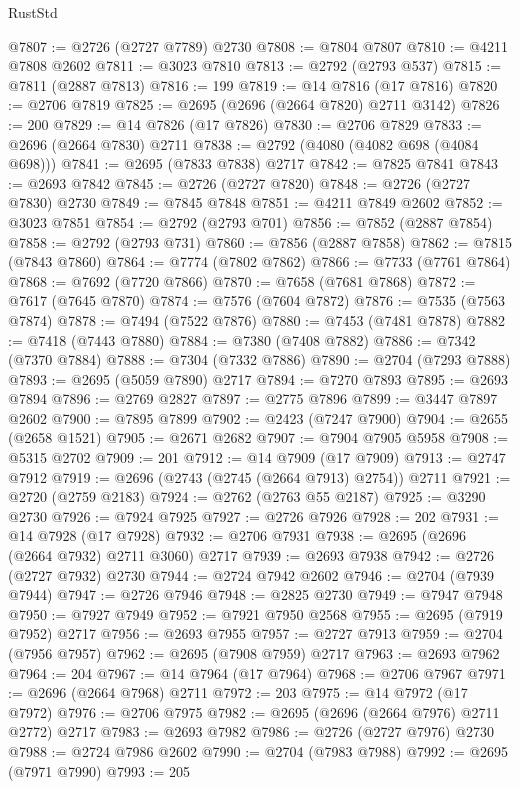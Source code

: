 \begin{lexlean}{RustStd}
\begin{coremodule}
@7807 := @2726 (@2727 @7789) @2730
@7808 := @7804 @7807
@7810 := @4211 @7808 @2602
@7811 := @3023 @7810
@7813 := @2792 (@2793 @537)
@7815 := @7811 (@2887 @7813)
@7816 := 199
@7819 := @14 @7816 (@17 @7816)
@7820 := @2706 @7819
@7825 := @2695 (@2696 (@2664 @7820) @2711 @3142)
@7826 := 200
@7829 := @14 @7826 (@17 @7826)
@7830 := @2706 @7829
@7833 := @2696 (@2664 @7830) @2711
@7838 := @2792 (@4080 (@4082 @698 (@4084 @698)))
@7841 := @2695 (@7833 @7838) @2717
@7842 := @7825 @7841
@7843 := @2693 @7842
@7845 := @2726 (@2727 @7820)
@7848 := @2726 (@2727 @7830) @2730
@7849 := @7845 @7848
@7851 := @4211 @7849 @2602
@7852 := @3023 @7851
@7854 := @2792 (@2793 @701)
@7856 := @7852 (@2887 @7854)
@7858 := @2792 (@2793 @731)
@7860 := @7856 (@2887 @7858)
@7862 := @7815 (@7843 @7860)
@7864 := @7774 (@7802 @7862)
@7866 := @7733 (@7761 @7864)
@7868 := @7692 (@7720 @7866)
@7870 := @7658 (@7681 @7868)
@7872 := @7617 (@7645 @7870)
@7874 := @7576 (@7604 @7872)
@7876 := @7535 (@7563 @7874)
@7878 := @7494 (@7522 @7876)
@7880 := @7453 (@7481 @7878)
@7882 := @7418 (@7443 @7880)
@7884 := @7380 (@7408 @7882)
@7886 := @7342 (@7370 @7884)
@7888 := @7304 (@7332 @7886)
@7890 := @2704 (@7293 @7888)
@7893 := @2695 (@5059 @7890) @2717
@7894 := @7270 @7893
@7895 := @2693 @7894
@7896 := @2769 @2827
@7897 := @2775 @7896
@7899 := @3447 @7897 @2602
@7900 := @7895 @7899
@7902 := @2423 (@7247 @7900)
@7904 := @2655 (@2658 @1521)
@7905 := @2671 @2682
@7907 := @7904 @7905 @5958
@7908 := @5315 @2702
@7909 := 201
@7912 := @14 @7909 (@17 @7909)
@7913 := @2747 @7912
@7919 := @2696 (@2743 (@2745 (@2664 @7913) @2754)) @2711
@7921 := @2720 (@2759 @2183)
@7924 := @2762 (@2763 @55 @2187)
@7925 := @3290 @2730
@7926 := @7924 @7925
@7927 := @2726 @7926
@7928 := 202
@7931 := @14 @7928 (@17 @7928)
@7932 := @2706 @7931
@7938 := @2695 (@2696 (@2664 @7932) @2711 @3060) @2717
@7939 := @2693 @7938
@7942 := @2726 (@2727 @7932) @2730
@7944 := @2724 @7942 @2602
@7946 := @2704 (@7939 @7944)
@7947 := @2726 @7946
@7948 := @2825 @2730
@7949 := @7947 @7948
@7950 := @7927 @7949
@7952 := @7921 @7950 @2568
@7955 := @2695 (@7919 @7952) @2717
@7956 := @2693 @7955
@7957 := @2727 @7913
@7959 := @2704 (@7956 @7957)
@7962 := @2695 (@7908 @7959) @2717
@7963 := @2693 @7962
@7964 := 204
@7967 := @14 @7964 (@17 @7964)
@7968 := @2706 @7967
@7971 := @2696 (@2664 @7968) @2711
@7972 := 203
@7975 := @14 @7972 (@17 @7972)
@7976 := @2706 @7975
@7982 := @2695 (@2696 (@2664 @7976) @2711 @2772) @2717
@7983 := @2693 @7982
@7986 := @2726 (@2727 @7976) @2730
@7988 := @2724 @7986 @2602
@7990 := @2704 (@7983 @7988)
@7992 := @2695 (@7971 @7990)
@7993 := 205

\end{coremodule}
\end{lexlean}
